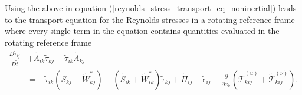 \documentclass[oneside,a4paper,11pt]{report}
\newcommand{\rs}{\tau}          %
\begin{document}
Using the above in equation (\ref{reynolds_stress_transport_eq_noninertial}) leads to the transport equation for the Reynolds stresses in a rotating reference frame where every single term in the equation contains quantities evaluated in the rotating reference frame
\begin{align}
\frac{D \tilde{\rs}_{ij} }{D \tilde{t}} &+ \tilde{\Lambda}_{ik} \tilde{\rs}_{kj} - \tilde{\rs}_{ik} \tilde{\Lambda}_{kj} \nonumber \\
&=  -\tilde{\rs}_{ik} (\tilde{S}_{kj} - \tilde{W}^*_{kj}) - (\tilde{S}_{ik} + \tilde{W}^*_{ik} ) \tilde{\rs}_{kj} + \tilde{\Pi}_{ij} - \tilde{\epsilon}_{ij} - \frac{\partial}{\partial \tilde{x}_k} \left ( \tilde{\mathcal{T}}^{(u)}_{kij} + \tilde{\mathcal{T}}^{(\nu)}_{kij} \right ).
\end{align}


%
\end{document}
